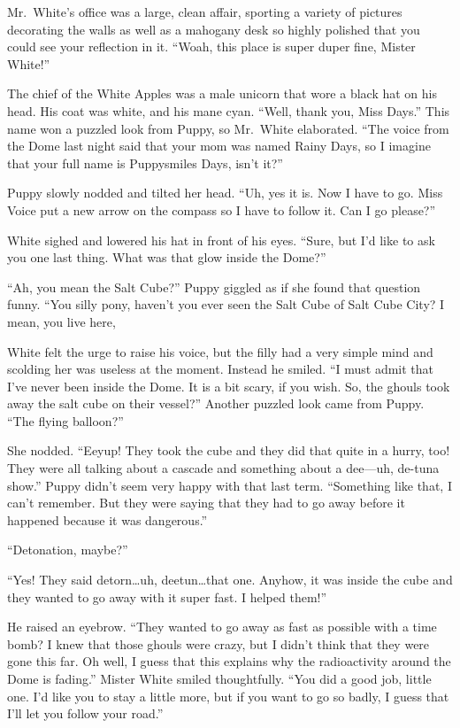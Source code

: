 Mr.~White's office was a large, clean affair, sporting a variety of pictures decorating the walls as well as a mahogany desk so highly polished that you could see your reflection in it. ``Woah, this place is super duper fine, Mister White!''

The chief of the White Apples was a male unicorn that wore a black hat on his head. His coat was white, and his mane cyan. ``Well, thank you, Miss Days.'' This name won a puzzled look from Puppy, so Mr.~White elaborated. ``The voice from the Dome last night said that your mom was named Rainy Days, so I imagine that your full name is Puppysmiles Days, isn't it?''

Puppy slowly nodded and tilted her head. ``Uh, yes it is. Now I have to go. Miss Voice put a new arrow on the compass so I have to follow it. Can I go please?''

White sighed and lowered his hat in front of his eyes. ``Sure, but I'd like to ask you one last thing. What was that glow inside the Dome?''

``Ah, you mean the Salt Cube?'' Puppy giggled as if she found that question funny. ``You silly pony, haven't you ever seen the Salt Cube of Salt Cube City? I mean, you live here, 

White felt the urge to raise his voice, but the filly had a very simple mind and scolding her was useless at the moment. Instead he smiled. ``I must admit that I've never been inside the Dome. It is a bit scary, if you wish. So, the ghouls took away the salt cube on their vessel?'' Another puzzled look came from Puppy. ``The flying balloon?''

She nodded. ``Eeyup! They took the cube and they did that quite in a hurry, too! They were all talking about a cascade and something about a dee---uh, de-tuna show.'' Puppy didn't seem very happy with that last term. ``Something like that, I can't remember. But they were saying that they had to go away before it happened because it was dangerous.''

``Detonation, maybe?''

``Yes! They said detorn\dots uh, deetun\dots that one. Anyhow, it was inside the cube and they wanted to go away with it super fast. I helped them!''

He raised an eyebrow. ``They wanted to go away as fast as possible with a time bomb? I knew that those ghouls were crazy, but I didn't think that they were gone this far. Oh well, I guess that this explains why the radioactivity around the Dome is fading.'' Mister White smiled thoughtfully. ``You did a good job, little one. I'd like you to stay a little more, but if you want to go so badly, I guess that I'll let you follow your road.''

